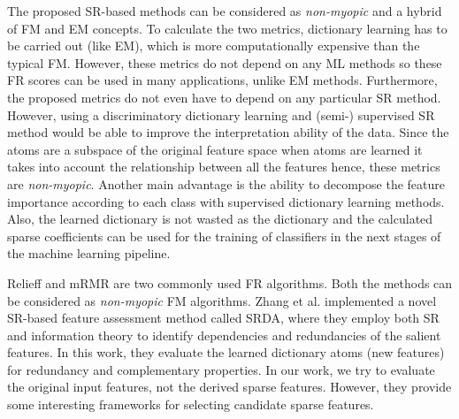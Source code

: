 The proposed SR-based methods can be considered as \textit{non-myopic} and a hybrid of FM and EM concepts. To calculate the two metrics, dictionary learning has to be carried out (like EM), which is more computationally expensive than the typical FM. However, these metrics do not depend on any ML methods so these FR scores can be used in many applications, unlike EM methods. Furthermore, the proposed metrics do not even have to depend on any particular SR method. However, using a discriminatory dictionary learning and (semi-) supervised SR method would be able to improve the interpretation ability of the data. Since the atoms are a subspace of the original feature space when atoms are learned it takes into account the relationship between all the features hence, these metrics are \textit{non-myopic}. Another main advantage is the ability to decompose the feature importance according to each class with supervised dictionary learning methods. Also, the learned dictionary is not wasted as the dictionary and the calculated sparse coefficients can be used for the training of classifiers in the next stages of the machine learning pipeline. 


Relieff\cite{Kononenko1997} and mRMR\cite{Ding2005} are two commonly used FR algorithms. Both the methods can be considered as \textit{non-myopic} FM algorithms. Zhang et al.\cite{Zhang2019} implemented a novel SR-based feature assessment method called SRDA, where they employ both SR and information theory to identify dependencies and redundancies of the salient features. In this work, they evaluate the learned dictionary atoms (new features) for redundancy and complementary properties. In our work, we try to evaluate the original input features, not the derived sparse features. However, they provide some interesting frameworks for selecting candidate sparse features.

 
